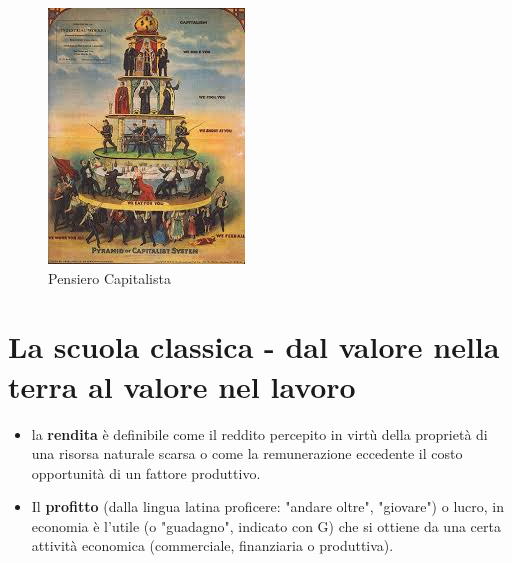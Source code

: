 \documentclass{article}
\begin{document}
\begin{figure}[h!]
\centering
\includegraphics[scale=1.0]{images/fisiocratici.jpeg}
\caption{Pensiero Capitalista}
\label{fig:universe}
\end{figure}


\section{La scuola classica - dal valore nella terra al valore nel lavoro}
\begin{itemize}
    \item  la \textbf{rendita} è definibile come il reddito percepito in virtù della proprietà di una risorsa naturale scarsa o come la remunerazione eccedente il costo opportunità di un fattore produttivo.
    \item Il \textbf{profitto} (dalla lingua latina proficere: "andare oltre", "giovare") o lucro, in economia è l'utile (o "guadagno", indicato con G) che si ottiene da una certa attività economica (commerciale, finanziaria o produttiva).
\end{itemize}
\end{document}
